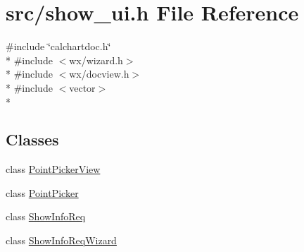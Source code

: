 \hypertarget{a00245}{\section{src/show\-\_\-ui.h File Reference}
\label{a00245}
}
{\ttfamily \#include \char`\"{}calchartdoc.\-h\char`\"{}}\\*
{\ttfamily \#include $<$wx/wizard.\-h$>$}\\*
{\ttfamily \#include $<$wx/docview.\-h$>$}\\*
{\ttfamily \#include $<$vector$>$}\\*
\subsection*{Classes}
\begin{DoxyCompactItemize}
\item 
class \hyperlink{a00115}{Point\-Picker\-View}
\item 
class \hyperlink{a00114}{Point\-Picker}
\item 
class \hyperlink{a00138}{Show\-Info\-Req}
\item 
class \hyperlink{a00139}{Show\-Info\-Req\-Wizard}
\end{DoxyCompactItemize}

